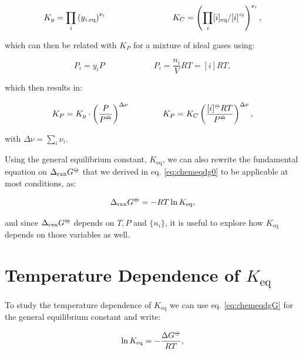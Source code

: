 \documentclass[
  9pt,
]{extbook}
\theoremstyle{definition}
\theoremstyle{definition}
\theoremstyle{definition}
\theoremstyle{definition}
\theoremstyle{remark}
\begin{document}
\begin{equation}
K_y =\prod_i \left( y_{i,\text{eq}} \right)^{\nu_i} \qquad \qquad \qquad \qquad K_C =\left( \prod_i [i]_{\text{eq}}/[i]^{-\kern-6pt{\ominus}\kern-6pt-}\right)^{\nu_i},
\label{eq:kxkcdef}
\end{equation}

which can then be related with \(K_P\) for a mixture of ideal gases using:

\begin{equation}
P_i = y_i P \qquad \qquad \qquad P_i=\frac{n_i}{V}RT=[i]RT,
\label{eq:kxkcdef2}
\end{equation}

which then results in:

\begin{equation}
K_P = K_y\cdot \left(\frac{P}{P^{-\kern-6pt{\ominus}\kern-6pt-}}\right)^{\Delta \nu} \qquad \qquad K_P = K_C \left( \frac{[i]^{-\kern-6pt{\ominus}\kern-6pt-}RT}{P^{-\kern-6pt{\ominus}\kern-6pt-}} \right)^{\Delta \nu},
\label{eq:kxkcdef3}
\end{equation}

with \(\Delta \nu =\sum_i \nu_i\).

Using the general equilibrium constant, \(K_{\text{eq}}\), we can also rewrite the fundamental equation on \(\Delta_{\text{rxn}} G^{-\kern-6pt{\ominus}\kern-6pt-}\) that we derived in eq. \eqref{eq:chemeqdg0} to be applicable at most conditions, as:

\begin{equation}
\Delta_{\text{rxn}} G^{-\kern-6pt{\ominus}\kern-6pt-}= - RT \ln K_{\text{eq}},
\label{eq:chemeqdgG}
\end{equation}

and since \(\Delta_{\text{rxn}} G^{-\kern-6pt{\ominus}\kern-6pt-}\) depends on \(T,P\) and \(\{n_i\}\), it is useful to explore how \(K_{\text{eq}}\) depends on those variables as well.

\section{\texorpdfstring{Temperature Dependence of \(K_{\text{eq}}\)}{Temperature Dependence of K\_\{\textbackslash text\{eq\}\}}}\label{temperature-dependence-of-k_texteq}

To study the temperature dependence of \(K_{\text{eq}}\) we can use eq. \eqref{eq:chemeqdgG} for the general equilibrium constant and write:

\begin{equation}
\ln K_{\text{eq}} = -\frac{\Delta G^{-\kern-6pt{\ominus}\kern-6pt-}}{RT},
\label{eq:kptemp1}
\end{equation}
\end{document}
